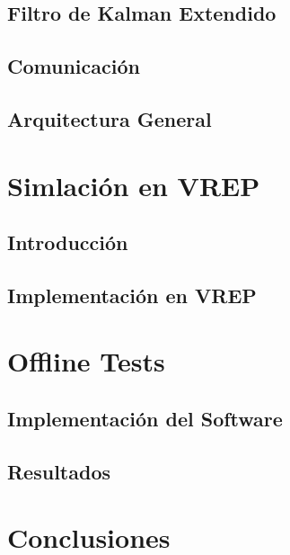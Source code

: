 \documentclass[11pt, oneside]{book} %
\begin{document}
\section{Filtro de Kalman Extendido}


\newpage
\section{Comunicaci\'on}


\section{Arquitectura General} \label{sec:SoftArch}



\chapter{Simlaci\'on en VREP}
\section{Introducci\'on}


\section{Implementaci\'on en VREP}


\chapter{Offline Tests}
\section{Implementaci\'on del Software}


\section{Resultados}



\chapter{Conclusiones} \label{chap:c6_conclusions}

\end{document}
